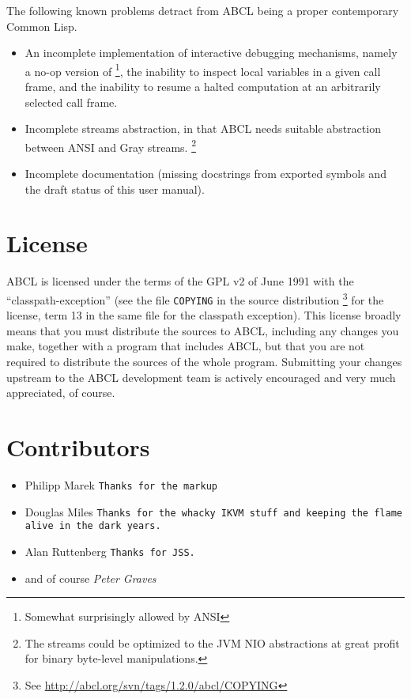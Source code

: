 \documentclass[10pt]{book}
\begin{document}
The following known problems detract from \textsc{ABCL} being a proper
contemporary Common Lisp.
\begin{itemize}
\item An incomplete implementation of interactive debugging mechanisms,
  namely a no-op version of  \footnote{Somewhat surprisingly
    allowed by \textsc{ANSI}}, the inability to inspect local variables
  in a given call frame, and the inability to resume a halted
  computation at an arbitrarily selected call frame.
\item Incomplete streams abstraction, in that \textsc{ABCL} needs
  suitable abstraction between \textsc{ANSI} and Gray
  streams.  \footnote{The streams could be optimized to the
    \textsc{JVM} NIO \cite{nio} abstractions at great profit for
    binary byte-level manipulations.}
\item Incomplete documentation (missing docstrings from exported
  symbols and the draft status of this user manual).
\end{itemize}



\section{License}

\textsc{ABCL} is licensed under the terms of the \textsc{GPL} v2 of
June 1991 with the ``classpath-exception'' (see the file
\texttt{COPYING} in the source distribution \footnote{See
  \url{http://abcl.org/svn/tags/1.2.0/abcl/COPYING}} for
the license, term 13 in the same file for the classpath exception).
This license broadly means that you must distribute the sources to
ABCL, including any changes you make, together with a program that
includes ABCL, but that you are not required to distribute the sources
of the whole program.  Submitting your changes upstream to the ABCL
development team is actively encouraged and very much appreciated, of
course.

\section{Contributors}

\begin{itemize}
\item Philipp Marek \texttt{Thanks for the markup}
\item Douglas Miles \texttt{Thanks for the whacky IKVM stuff and keeping the flame alive
  in the dark years.}
\item Alan Ruttenberg \texttt{Thanks for JSS.}
\item and of course
\emph{Peter Graves}
\end{itemize}
\end{document}
